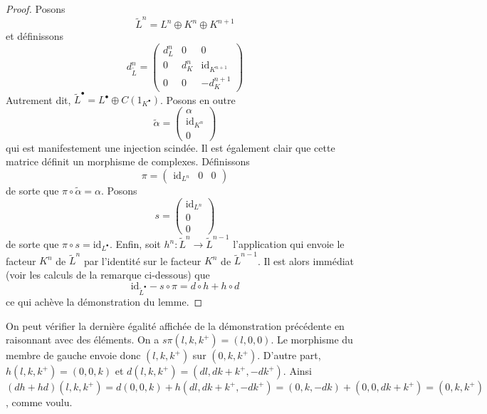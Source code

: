 \begin{proof}
Posons
$$
\tilde L^n = L^n \oplus K^n \oplus K^{n + 1}
$$
et définissons
$$
d^n_{\tilde L} =
\left(
\begin{matrix}
d^n_L & 0 & 0 \\
0 & d^n_K & \text{id}_{K^{n + 1}} \\
0 & 0 & -d^{n + 1}_K
\end{matrix}
\right)
$$
Autrement dit, $\tilde L^\bullet = L^\bullet \oplus C(1_{K^\bullet})$.
Posons en outre
$$
\tilde \alpha =
\left(
\begin{matrix}
\alpha \\
\text{id}_{K^n} \\
0
\end{matrix}
\right)
$$
qui est manifestement une injection scindée. Il est également clair que cette
matrice définit un morphisme de complexes. Définissons
$$
\pi =
\left(
\begin{matrix}
\text{id}_{L^n} &
0 &
0
\end{matrix}
\right)
$$
de sorte que $\pi \circ \tilde \alpha = \alpha$. Posons
$$
s =
\left(
\begin{matrix}
\text{id}_{L^n} \\
0 \\
0
\end{matrix}
\right)
$$
de sorte que $\pi \circ s = \text{id}_{L^\bullet}$. Enfin, soit
$h^n : \tilde L^n \to \tilde L^{n - 1}$ l'application qui envoie le facteur
$K^n$ de $\tilde L^n$ par l'identité sur le facteur $K^n$ de
$\tilde L^{n - 1}$. Il est alors immédiat (voir les calculs de la remarque
ci-dessous) que
$$
\text{id}_{\tilde L^\bullet} - s \circ \pi
=
d \circ h + h \circ d
$$
ce qui achève la démonstration du lemme.
\end{proof}

\begin{remark}
\label{remark-compute-modules}
On peut vérifier la dernière égalité affichée de la démonstration précédente en
raisonnant avec des éléments. On a
$s\pi(l, k, k^{+}) = (l, 0, 0)$.
Le morphisme du membre de gauche envoie donc
$(l, k, k^{+})$ sur $(0, k, k^{+})$.
D'autre part, $h(l, k, k^{+}) = (0, 0, k)$ et
$d(l, k, k^{+}) = (dl, dk + k^{+}, -dk^{+})$.
Ainsi $(dh + hd)(l, k, k^{+}) =
d(0, 0, k) + h(dl, dk + k^{+}, -dk^{+}) =
(0, k, -dk) + (0, 0, dk + k^{+}) = (0, k, k^{+})$, comme voulu.
\end{remark}

